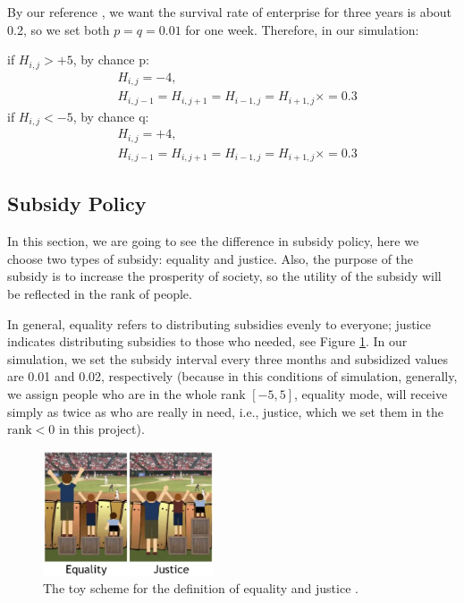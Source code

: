 \documentclass[10pt]{article}
\begin{document}
\begin{multicols}{2}
        By our reference \cite{3gen}, we want the survival rate of enterprise for three years is about 0.2, so we set both $p = q = 0.01$ for one week. Therefore, in our simulation:
        
        \noindent if $H_{i,j} > +5$,  by chance p:
        \begin{align*}
            & H_{i,j} = -4, \\
            & H_{i,j-1} = H_{i,j+1} = H_{i-1,j} = H_{i+1,j} ×= 0.3
        \end{align*}
        \noindent if $H_{i,j} < -5$, by chance q:
        \begin{align*}
            & H_{i,j} = +4, \\
            & H_{i,j-1} = H_{i,j+1} = H_{i-1,j} = H_{i+1,j} ×= 0.3
        \end{align*}


    \subsection{Subsidy Policy}
        In this section, we are going to see the difference in subsidy policy, here we choose two types of subsidy: equality and justice. Also, the purpose of the subsidy is to increase the prosperity of society, so the utility of the subsidy will be reflected in the rank of people.
        
        In general, equality refers to distributing subsidies evenly to everyone; justice indicates distributing subsidies to those who needed, see Figure \ref{toy}. In our simulation, we set the subsidy interval every three months and subsidized values are 0.01 and 0.02, respectively (because in this conditions of simulation, generally, we assign people who are in the whole rank $[-5,5]$, equality mode, will receive simply as twice as who are really in need, i.e., justice, which we set them in the $\text{rank} < 0$ in this project).

    \begin{figure}[H]
        \centering 
        \includegraphics[width = 0.45\textwidth]{toy.png}
        \caption{The toy scheme for the definition of equality and justice \cite{toy}.}
        \label{toy}
    \end{figure}


\end{multicols}
\end{document}

